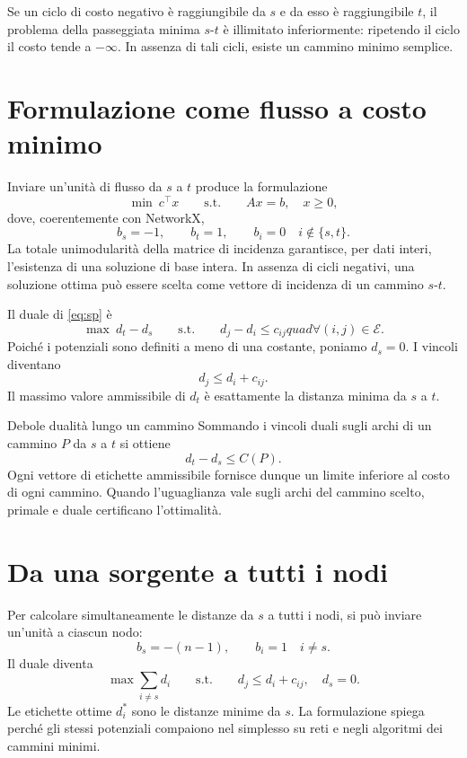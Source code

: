 \documentclass[11pt,a4paper]{article}
\newcommand{\E}{\mathcal{E}}
\begin{document}
\begin{warningbox}
Se un ciclo di costo negativo è raggiungibile da $s$ e da esso è raggiungibile $t$, il problema della passeggiata minima $s$-$t$ è illimitato inferiormente: ripetendo il ciclo il costo tende a $-\infty$. In assenza di tali cicli, esiste un cammino minimo semplice.
\end{warningbox}

\section{Formulazione come flusso a costo minimo}

Inviare un'unità di flusso da $s$ a $t$ produce la formulazione
\begin{equation}\label{eq:sp}
\min\ c^\top x\qquad\text{s.t.}\qquad Ax=b,\quad x\geq0,
\end{equation}
dove, coerentemente con NetworkX,
\[
b_s=-1,\qquad b_t=1,\qquad b_i=0\quad i\notin\{s,t\}.
\]
La totale unimodularità della matrice di incidenza garantisce, per dati interi, l'esistenza di una soluzione di base intera. In assenza di cicli negativi, una soluzione ottima può essere scelta come vettore di incidenza di un cammino $s$-$t$.

Il duale di \eqref{eq:sp} è
\begin{equation}\label{eq:dual}
\max\ d_t-d_s\qquad\text{s.t.}\qquad d_j-d_i\leq c_{ij}quad\forall(i,j)\in\E.
\end{equation}
Poiché i potenziali sono definiti a meno di una costante, poniamo $d_s=0$. I vincoli diventano
\[
d_j\leq d_i+c_{ij}.
\]
Il massimo valore ammissibile di $d_t$ è esattamente la distanza minima da $s$ a $t$.

\begin{examplebox}{Debole dualità lungo un cammino}
Sommando i vincoli duali sugli archi di un cammino $P$ da $s$ a $t$ si ottiene
\[
d_t-d_s\leq C(P).
\]
Ogni vettore di etichette ammissibile fornisce dunque un limite inferiore al costo di ogni cammino. Quando l'uguaglianza vale sugli archi del cammino scelto, primale e duale certificano l'ottimalità.
\end{examplebox}

\section{Da una sorgente a tutti i nodi}

Per calcolare simultaneamente le distanze da $s$ a tutti i nodi, si può inviare un'unità a ciascun nodo:
\[
b_s=-(n-1),\qquad b_i=1\quad i\neq s.
\]
Il duale diventa
\[
\max\sum_{i\neq s}d_i
\qquad\text{s.t.}\qquad d_j\leq d_i+c_{ij},\quad d_s=0.
\]
Le etichette ottime $d_i^*$ sono le distanze minime da $s$. La formulazione spiega perché gli stessi potenziali compaiono nel simplesso su reti e negli algoritmi dei cammini minimi.
\end{document}
